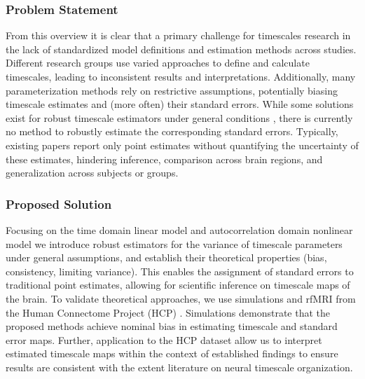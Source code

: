 \documentclass[latex/main.tex]{subfiles}
\begin{document}
\subsubsection{Problem Statement}
From this overview it is clear that a primary challenge for timescales research in the lack of standardized model definitions and estimation methods across studies. Different research groups use varied approaches to define and calculate timescales, leading to inconsistent results and interpretations. Additionally, many parameterization methods rely on restrictive assumptions, potentially biasing timescale estimates and (more often) their standard errors. While some solutions exist for robust timescale estimators under general conditions \citep{zeraati_flexible_2022, donoghue_parameterizing_2020, gao_neuronal_2020}, there is currently no method to robustly estimate the corresponding standard errors. Typically, existing papers report only point estimates without quantifying the uncertainty of these estimates, hindering inference, comparison across brain regions, and generalization across subjects or groups.\\

\subsubsection{Proposed Solution}
Focusing on the time domain linear model and autocorrelation domain nonlinear model we introduce robust estimators for the variance of timescale parameters under general assumptions, and establish their theoretical properties (bias, consistency, limiting variance). This enables the assignment of standard errors to traditional point estimates, allowing for scientific inference on timescale maps of the brain. To validate theoretical approaches, we use simulations and rfMRI from the Human Connectome Project (HCP) \citep{van_essen_wu-minn_2013}. Simulations demonstrate that the proposed methods achieve nominal bias in estimating timescale and standard error maps. Further, application to the HCP dataset allow us to interpret estimated timescale maps within the context of established findings to ensure results are consistent with the extent literature on neural timescale organization.\\
\end{document}
